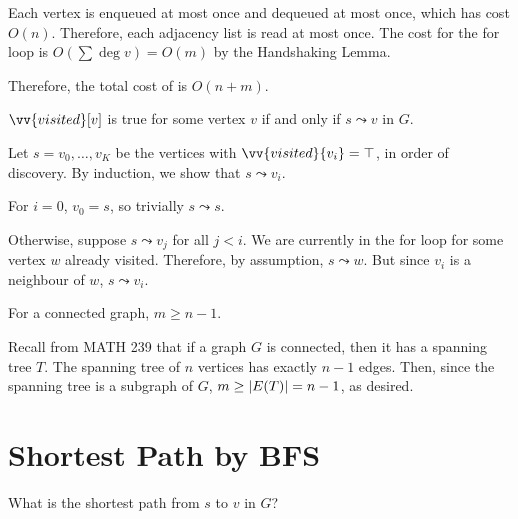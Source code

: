 Each vertex is enqueued at most once and dequeued at most once,
which has cost $O(n)$.
Therefore, each adjacency list is read at most once.
The cost for the for loop is $O(\sum \deg v) = O(m)$ by the Handshaking Lemma.

Therefore, the total cost of  is $O(n+m)$.

\begin{lemma}\label{lemma:bfs:visited}
  $\vv{visited}[v]$ is true for some vertex $v$
  if and only if $s \leadsto v$ in $G$.
\end{lemma}
\begin{prf}
  Let $s = v_0, \dotsc, v_K$ be the vertices with $\vv{visited}{v_i} = \top$,
  in order of discovery.
  By induction, we show that $s \leadsto v_i$.

  For $i = 0$, $v_0 = s$, so trivially $s \leadsto s$.

  Otherwise, suppose $s \leadsto v_j$ for all $j < i$.
  We are currently in the for loop for some vertex $w$ already visited.
  Therefore, by assumption, $s \leadsto w$.
  But since $v_i$ is a neighbour of $w$, $s \leadsto v_i$.
\end{prf}


\begin{xca}
  For a connected graph, $m \geq n - 1$.
\end{xca}
\begin{prf}
  Recall from MATH 239 that if a graph $G$ is connected, then it has a spanning tree $T$.
  The spanning tree of $n$ vertices has exactly $n-1$ edges.
  Then, since the spanning tree is a subgraph of $G$,
  $m \geq \abs{E(T)} = n-1$, as desired.
\end{prf}

\section{Shortest Path by BFS}

\begin{problem}
  What is the shortest path from $s$ to $v$ in $G$?
\end{problem}

